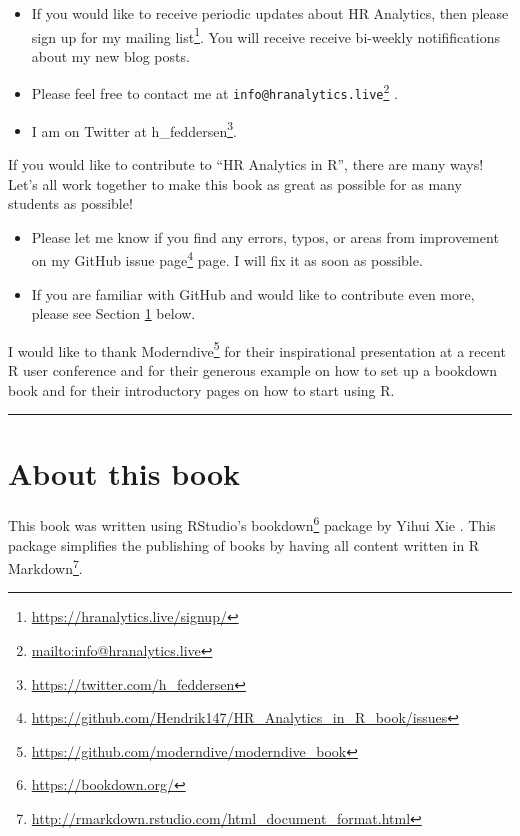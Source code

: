 \documentclass[
  12pt, krantz2,
]{krantz}
\providecommand{\tightlist}{%
  \setlength{\itemsep}{0pt}\setlength{\parskip}{0pt}}
\renewcommand{\href}[2]{#2\footnote{\url{#1}}}
\begin{document}
\begin{itemize}
\tightlist
\item
  If you would like to receive periodic updates about HR Analytics, then please sign up for my \href{https://hranalytics.live/signup/}{mailing list}. You will receive receive bi-weekly notififications about my new blog posts.
\item
  Please feel free to contact me at \href{mailto:info@hranalytics.live}{\nolinkurl{info@hranalytics.live}} .
\item
  I am on Twitter at \href{https://twitter.com/h_feddersen}{h\_feddersen}.
\end{itemize}

If you would like to contribute to ``HR Analytics in R'', there are many ways! Let's all work together to make this book as great as possible for as many students as possible!

\begin{itemize}
\tightlist
\item
  Please let me know if you find any errors, typos, or areas from improvement on my \href{https://github.com/Hendrik147/HR_Analytics_in_R_book/issues}{GitHub issue page} page. I will fix it as soon as possible.
\item
  If you are familiar with GitHub and would like to contribute even more, please see Section \ref{sec:about-book} below.
\end{itemize}

I would like to thank \href{https://github.com/moderndive/moderndive_book}{Moderndive} for their inspirational presentation at a recent R user conference and for their generous example on how to set up a bookdown book and for their introductory pages on how to start using R.

\begin{center}\rule{0.5\linewidth}{\linethickness}\end{center}

\hypertarget{sec:about-book}{%
\section{About this book}\label{sec:about-book}}

This book was written using RStudio's \href{https://bookdown.org/}{bookdown} package by Yihui Xie \citep{R-bookdown}. This package simplifies the publishing of books by having all content written in \href{http://rmarkdown.rstudio.com/html_document_format.html}{R Markdown}.
\end{document}
